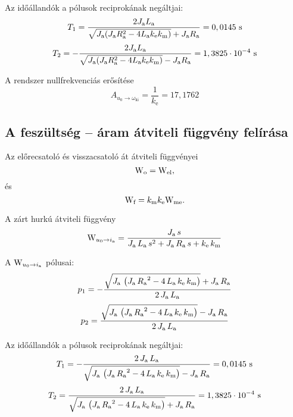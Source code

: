Az időállandók a pólusok reciprokának negáltjai:
\begin{equation}\label{eq:T1}
	T_1 = \frac{2J_\text{a}L_\text{a}}{\sqrt{J_\text{a}(J_\text{a}R_\text{a}^2 - 4L_\text{a}k_\text{e}k_\text{m})} + J_\text{a}R_\text{a}} = 0,0145\text{ s}
\end{equation}
\begin{equation}
	T_2 = -\frac{2J_\text{a}L_\text{a}}{\sqrt{J_\text{a}(J_\text{a}R_\text{a}^2 - 4L_\text{a}k_\text{e}k_\text{m})} - J_\text{a}R_\text{a}} = 1,3825\cdot 10^{-4}\text{ s}
\end{equation}

A rendszer nullfrekvenciás erősítése
\begin{equation}
	A_{u_0\rightarrow\omega_\text{ki}} = \frac{1}{k_\text{e}} = 17,1762
\end{equation}


\subsection{A feszültség -- áram átviteli függvény felírása}
\label{subsect:Wu-i}

Az előrecsatoló és visszacsatoló át átviteli függvényei
\begin{equation}
	\mathrm{W}_\text{o} = \mathrm{W}_\text{el},
\end{equation} és 
\begin{equation}
	\mathrm{W}_\text{f} = k_\text{m}k_\text{e}\mathrm{W}_\text{me}.
\end{equation}

A zárt hurkú átviteli függvény
\begin{equation}
	\mathrm{W}_{u_0\rightarrow i_\text{a}} = 
	\frac{J_\text{a}\, s}{J_\text{a}\, L_\text{a}\, s^2 + J_\text{a}\, R_\text{a}\, s + k_\text{e}\, k_\text{m}}
\end{equation}

A $\mathrm{W}_{u_0\rightarrow i_\text{a}}$ pólusai:
\begin{equation}
	p_1 = -\frac{\sqrt{J_\text{a}\, \left(J_\text{a}\, {R_\text{a}}^2 - 4\, L_\text{a}\, k_\text{e}\, k_\text{m}\right)} + J_\text{a}\, R_\text{a}}{2\, J_\text{a}\, L_\text{a}}
\end{equation}
\begin{equation}
	p_2 = \frac{\sqrt{J_\text{a}\, \left(J_\text{a}\, {R_\text{a}}^2 - 4\, L_\text{a}\, k_\text{e}\, k_\text{m}\right)} - J_\text{a}\, R_\text{a}}{2\, J_\text{a}\, L_\text{a}}
\end{equation}

Az időállandók a pólusok reciprokának negáltjai:
\begin{equation}
	T_1 = -\frac{2\, J_\text{a}\, L_\text{a}}{\sqrt{J_\text{a}\, \left(J_\text{a}\, {R_\text{a}}^2 - 4\, L_\text{a}\, k_\text{e}\, k_\text{m}\right)} - J_\text{a}\, R_\text{a}} = 0,0145\text{ s}
\end{equation}
\begin{equation}
	T_2 = \frac{2\, J_\text{a}\, L_\text{a}}{\sqrt{J_\text{a}\, \left(J_\text{a}\, {R_\text{a}}^2 - 4\, L_\text{a}\, k_\text{e}\, k_\text{m}\right)} + J_\text{a}\, R_\text{a}} = 1,3825\cdot 10^{-4}\text{ s}
\end{equation}

